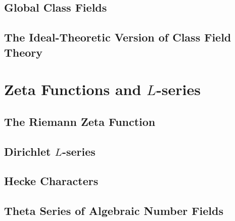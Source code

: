 \documentclass[oneside]{amsbook}
\numberwithin{ex}{section}
\begin{document}
\section{Global Class Fields}

\section{The Ideal-Theoretic Version of Class Field Theory}


\chapter{Zeta Functions and $L$-series}
\section{The Riemann Zeta Function}

\section{Dirichlet $L$-series}

\section{Hecke Characters}

\section{Theta Series of Algebraic Number Fields}

\end{document}
